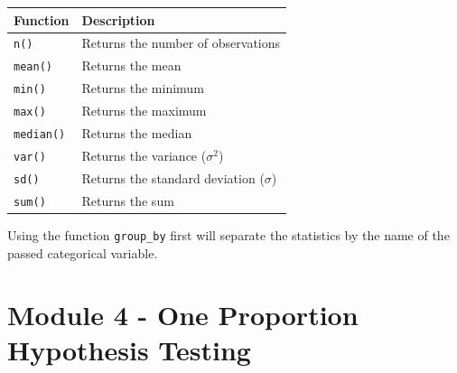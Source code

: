 \documentclass[10pt]{article}
\newcommand{\spacer}[0]{\par\vspace{0.1in}}
\begin{document}
\begin{tabular}{|l|l|}
\hline
\rowcolor[HTML]{EFEFEF} 
\textbf{Function} & \textbf{Description}                      \\ \hline
\texttt{n()}      & Returns the number of observations        \\ \hline
\texttt{mean()}   & Returns the mean                          \\ \hline
\texttt{min()}    & Returns the minimum                       \\ \hline
\texttt{max()}    & Returns the maximum                       \\ \hline
\texttt{median()} & Returns the median                        \\ \hline
\texttt{var()}    & Returns the variance ($\sigma^2$)         \\ \hline
\texttt{sd()}     & Returns the standard deviation ($\sigma$) \\ \hline
\texttt{sum()}    & Returns the sum                           \\ \hline
\end{tabular}
\spacer
Using the function \texttt{group\_by} first will separate the statistics by the name of the passed categorical variable.
\section{Module 4 - One Proportion Hypothesis Testing}
\end{document}
